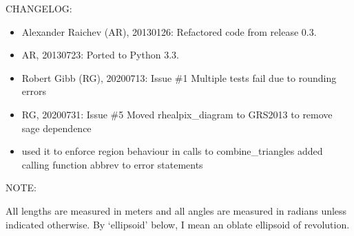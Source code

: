 \documentclass[a4paper,12ptopenany,oneside,english]{sphinxmanual}
\begin{document}
\sphinxAtStartPar
CHANGELOG:
\begin{itemize}
\item {} 
\sphinxAtStartPar
Alexander Raichev (AR), 2013\sphinxhyphen{}01\sphinxhyphen{}26: Refactored code from release 0.3.

\item {} 
\sphinxAtStartPar
AR, 2013\sphinxhyphen{}07\sphinxhyphen{}23: Ported to Python 3.3.

\item {} 
\sphinxAtStartPar
Robert Gibb (RG), 2020\sphinxhyphen{}07\sphinxhyphen{}13: Issue \#1 Multiple tests fail due to rounding errors

\item {} 
\sphinxAtStartPar
RG, 2020\sphinxhyphen{}07\sphinxhyphen{}31: Issue \#5 Moved rhealpix\_diagram to GRS2013 to remove sage dependence

\item {} \begin{description}
\sphinxAtStartPar
used it to enforce region behaviour in calls to combine\_triangles
added calling function abbrev to error statements

\end{description}

\end{itemize}

\sphinxAtStartPar
NOTE:

\sphinxAtStartPar
All lengths are measured in meters and all angles are measured in radians
unless indicated otherwise.
By ‘ellipsoid’ below, I mean an oblate ellipsoid of revolution.
\end{document}
